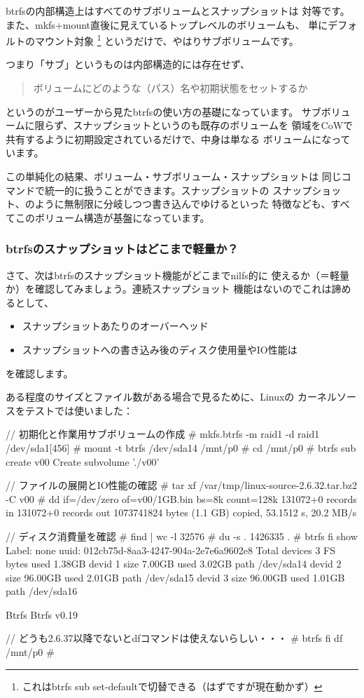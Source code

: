 \documentclass[mingoth,a4paper]{jsarticle}
\begin{document}
btrfsの内部構造上はすべてのサブボリュームとスナップショットは
対等です。また、mkfs+mount直後に見えているトップレベルのボリュームも、
単にデフォルトのマウント対象
\footnote{これはbtrfs sub set-defaultで切替できる（はずですが現在動かず）}
というだけで、やはりサブボリュームです。

つまり「サブ」というものは内部構造的には存在せず、
\begin{quote}
\Large{ボリュームにどのような（パス）名や初期状態をセットするか}
\end{quote}
というのがユーザーから見たbtrfsの使い方の基礎になっています。
サブボリュームに限らず、スナップショットというのも既存のボリュームを
領域をCoWで共有するように初期設定されているだけで、中身は単なる
ボリュームになっています。

この単純化の結果、ボリューム・サブボリューム・スナップショットは
同じコマンドで統一的に扱うことができます。スナップショットの
スナップショット、のように無制限に分岐しつつ書き込んでゆけるといった
特徴なども、すべてこのボリューム構造が基盤になっています。

\subsubsection{btrfsのスナップショットはどこまで軽量か？}
さて、次はbtrfsのスナップショット機能がどこまでnilfs的に
使えるか（＝軽量か）を確認してみましょう。連続スナップショット
機能はないのでこれは諦めるとして、
\begin{itemize}
\item スナップショットあたりのオーバーヘッド
\item スナップショットへの書き込み後のディスク使用量やIO性能は
\end{itemize}
を確認します。

ある程度のサイズとファイル数がある場合で見るために、Linuxの
カーネルソースをテストでは使いました：
\begin{commandline}
// 初期化と作業用サブボリュームの作成
# mkfs.btrfs -m raid1 -d raid1 /dev/sda1[456]
# mount -t btrfs /dev/sda14 /mnt/p0
# cd /mnt/p0
# btrfs sub create v00
Create subvolume './v00'

// ファイルの展開とIO性能の確認
# tar xf /var/tmp/linux-source-2.6.32.tar.bz2 -C v00
# dd if=/dev/zero of=v00/1GB.bin bs=8k count=128k
131072+0 records in
131072+0 records out
1073741824 bytes (1.1 GB) copied, 53.1512 s, 20.2 MB/s

// ディスク消費量を確認
# find | wc -l
32576
# du -s .
1426335 .
# btrfs fi show
Label: none  uuid: 012cb75d-8aa3-4247-904a-2e7e6a9602e8
        Total devices 3 FS bytes used 1.38GB
        devid    1 size 7.00GB used 3.02GB path /dev/sda14
        devid    2 size 96.00GB used 2.01GB path /dev/sda15
        devid    3 size 96.00GB used 1.01GB path /dev/sda16

Btrfs Btrfs v0.19

// どうも2.6.37以降でないとdfコマンドは使えないらしい・・・
# btrfs fi df /mnt/p0
#
\end{commandline}
\end{document}
